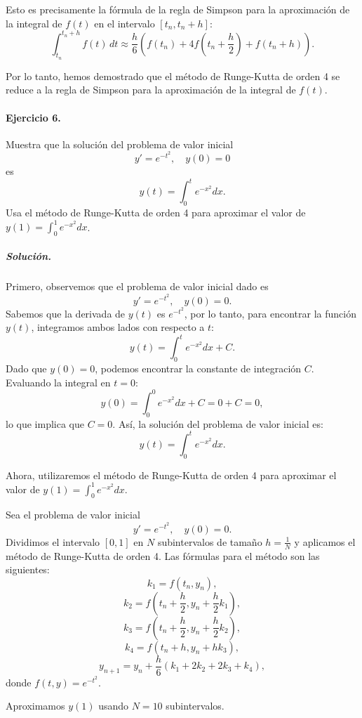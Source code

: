 \documentclass[12pt,letterpaper,oneside]{article}
\begin{document}
Esto es precisamente la fórmula de la regla de Simpson para la aproximación de la integral de \(f(t)\) en el intervalo \([t_n, t_n + h]\):
\[
\int_{t_n}^{t_n + h} f(t) \, dt \approx \frac{h}{6} \left(f(t_n) + 4f\left(t_n + \frac{h}{2}\right) + f(t_n + h)\right).
\]

Por lo tanto, hemos demostrado que el método de Runge-Kutta de orden 4 se reduce a la regla de Simpson para la aproximación de la integral de \(f(t)\).

\paragraph*{Ejercicio 6.} Muestra que la solución del problema de valor inicial
\[
y'=e^{-t^2},\quad y(0)=0
\]
es
\[
y(t)=\int_0^te^{-x^2}dx.
\]
Usa el método de Runge-Kutta de orden 4 para aproximar el valor de $y(1)=\int_0^1e^{-x^2}dx$.

\subparagraph*{Solución.}
Primero, observemos que el problema de valor inicial dado es
\[
y' = e^{-t^2}, \quad y(0) = 0.
\]
Sabemos que la derivada de \(y(t)\) es \(e^{-t^2}\), por lo tanto, para encontrar la función \(y(t)\), integramos ambos lados con respecto a \(t\):
\[
y(t) = \int_0^t e^{-x^2} dx + C.
\]
Dado que \(y(0) = 0\), podemos encontrar la constante de integración \(C\). Evaluando la integral en \(t = 0\):
\[
y(0) = \int_0^0 e^{-x^2} dx + C = 0 + C = 0,
\]
lo que implica que \(C = 0\). Así, la solución del problema de valor inicial es:
\[
y(t) = \int_0^t e^{-x^2} dx.
\]

Ahora, utilizaremos el método de Runge-Kutta de orden 4 para aproximar el valor de \(y(1) = \int_0^1 e^{-x^2} dx\).

Sea el problema de valor inicial
\[
y' = e^{-t^2}, \quad y(0) = 0.
\]
Dividimos el intervalo \([0,1]\) en \(N\) subintervalos de tamaño \(h = \frac{1}{N}\) y aplicamos el método de Runge-Kutta de orden 4. Las fórmulas para el método son las siguientes:
\[
k_1 = f(t_n, y_n),
\]
\[
k_2 = f\left(t_n + \frac{h}{2}, y_n + \frac{h}{2} k_1\right),
\]
\[
k_3 = f\left(t_n + \frac{h}{2}, y_n + \frac{h}{2} k_2\right),
\]
\[
k_4 = f\left(t_n + h, y_n + h k_3\right),
\]
\[
y_{n+1} = y_n + \frac{h}{6} (k_1 + 2k_2 + 2k_3 + k_4),
\]
donde \(f(t, y) = e^{-t^2}\).

Aproximamos \(y(1)\) usando \(N = 10\) subintervalos.
\end{document}
